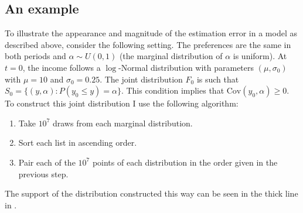 \documentclass[english, a4paper,12pt]{article}
\begin{document}
\subsection{An example} \label{ssec:RAexample}
To illustrate the appearance and magnitude of the estimation error in a model as described above, consider the following setting. The preferences are the same in both periods and $\alpha \sim U(0,1)$ (the marginal distribution of $\alpha$ is uniform). At $t = 0$, the income follows a $\log$-Normal distribution with parameters $(\mu, \sigma_{0})$ with $\mu = 10$ and $\sigma_{0} = 0.25$. The joint distribution $F_{0}$ is such that $S_{0} = \{(y,\alpha) : P(y_{0} \leq y) = \alpha\}$. This condition implies that $\mathrm{Cov}(y_{0}, \alpha) \geq 0$. To construct this joint distribution I use the following algorithm:
	\begin{enumerate}
		\item Take $10^{7}$ draws from each marginal distribution.
		\item Sort each list in ascending order.
		\item Pair each of the $10^{7}$ points of each distribution in the order given in the previous step.
	\end{enumerate}
The support of the distribution constructed this way can be seen in the thick line in . 
\end{document}
